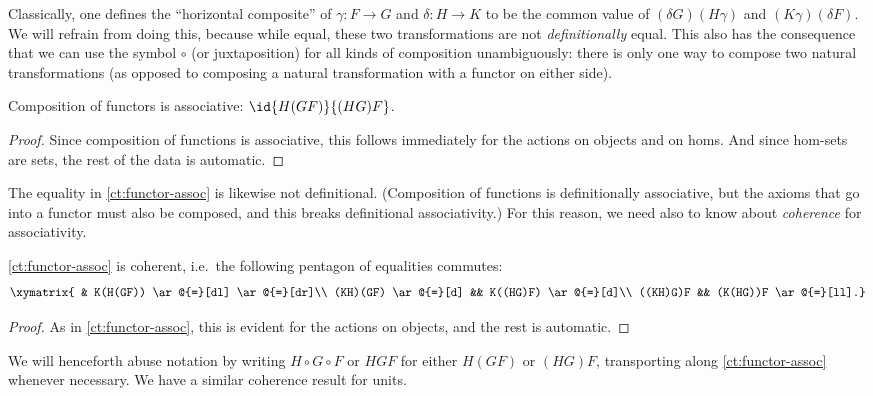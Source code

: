 %
%
Classically, one defines the ``horizontal composite'' of $\gamma:F\to G$ and $\delta:H\to K$ to be the common value of ${(\delta G)(H\gamma)}$ and ${(K\gamma)(\delta F)}$.
We will refrain from doing this, because while equal, these two transformations are not \emph{definitionally} equal.
This also has the consequence that we can use the symbol $\circ$ (or juxtaposition) for all kinds of composition unambiguously: there is only one way to compose two natural transformations (as opposed to composing a natural transformation with a functor on either side).

\begin{lem}\label{ct:functor-assoc}
  Composition of functors is associative: $\id{H(GF)}{(HG)F}$.
\end{lem}
\begin{proof}
  Since composition of functions is associative, this follows immediately for the actions on objects and on homs.
  And since hom-sets are sets, the rest of the data is automatic.
\end{proof}

The equality in \cref{ct:functor-assoc} is likewise not definitional.
(Composition of functions is definitionally associative, but the axioms that go into a functor must also be composed, and this breaks definitional associativity.)  For this reason, we need also to know about \emph{coherence} for associativity.

\begin{lem}\label{ct:pentagon}
  \cref{ct:functor-assoc} is coherent, i.e.\ the following pentagon of equalities commutes:
  \[ \xymatrix{ & K(H(GF)) \ar@{=}[dl] \ar@{=}[dr]\\
    (KH)(GF) \ar@{=}[d] && K((HG)F) \ar@{=}[d]\\
    ((KH)G)F && (K(HG))F \ar@{=}[ll].}
  \]
\end{lem}
\begin{proof}
  As in \cref{ct:functor-assoc}, this is evident for the actions on objects, and the rest is automatic.
\end{proof}

We will henceforth abuse notation by writing $H\circ G\circ F$ or $HGF$ for either $H(GF)$ or $(HG)F$, transporting along \cref{ct:functor-assoc} whenever necessary.
We have a similar coherence result for units.

